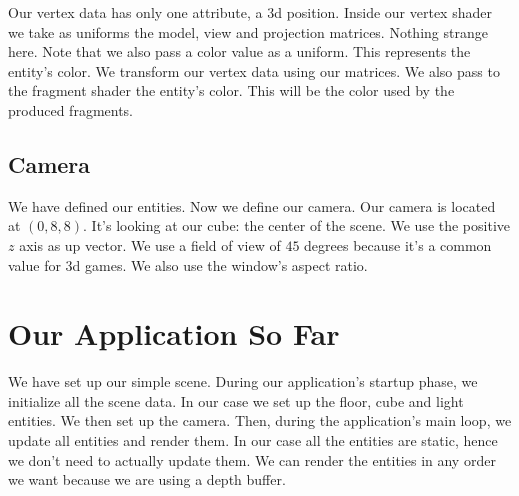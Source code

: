 \begin{minipage}{\linewidth}{\noindent}
    
\end{minipage}

Our vertex data has only one attribute, a 3d position.
Inside our vertex shader we take as uniforms the model,
view and projection matrices.
Nothing strange here.
Note that we also pass a color value as a uniform.
This represents the entity's color.
We transform our vertex data using our matrices.
We also pass to the fragment shader the entity's color.
This will be the color used by the produced fragments.

\subsection{Camera}

We have defined our entities.
Now we define our camera.
Our camera is located at $(0, 8, 8)$.
It's looking at our cube: the center of the scene.
We use the positive $z$ axis as up vector.
We use a field of view of $45$ degrees because it's a common value for 3d games.
We also use the window's aspect ratio.

\begin{minipage}{\linewidth}{\noindent}
    
\end{minipage}

\section{Our Application So Far}

We have set up our simple scene.
During our application's startup phase, we initialize all the scene data.
In our case we set up the floor, cube and light entities.
We then set up the camera.
Then, during the application's main loop, we update all entities and render them.
In our case all the entities are static, hence we don't need to actually update them.
We can render the entities in any order we want because we are using a depth buffer.

\begin{minipage}{\linewidth}{\noindent}
    
\end{minipage}
